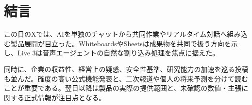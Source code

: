 \section{結言}
この日のXでは、AIを単独のチャットから共同作業やリアルタイム対話へ組み込む製品展開が目立った。WhiteboardsやSheetsは成果物を共同で扱う方向を示し、Live 3は音声エージェントの自然な割り込み処理を焦点に据えた。

同時に、企業の収益性、経営上の疑惑、安全性基準、研究能力の加速を巡る投稿も並んだ。確度の高い公式機能発表と、二次報道や個人の将来予測を分けて読むことが重要である。翌日以降は製品の実際の提供範囲と、未確認の数値・主張に関する正式情報が注目点となる。
